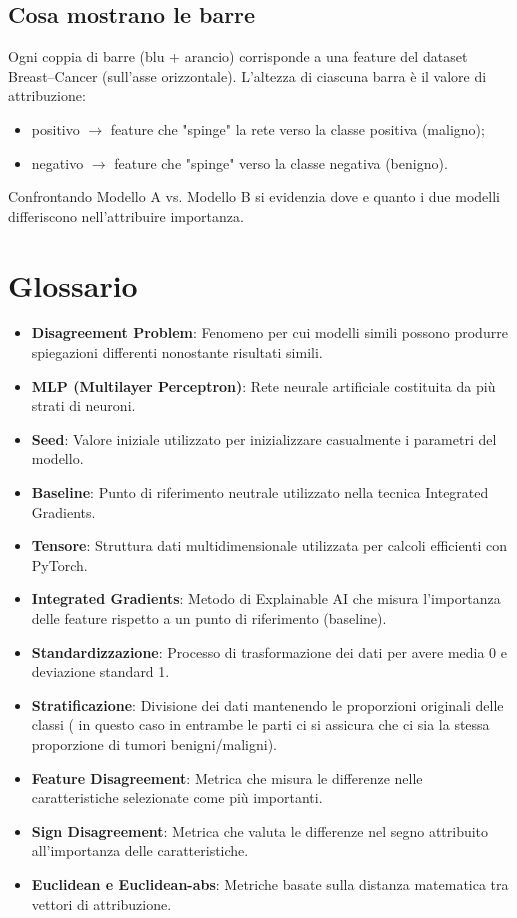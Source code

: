 \documentclass[a4paper,11pt]{article}
\begin{document}
\subsection*{Cosa mostrano le barre}
Ogni coppia di barre (blu + arancio) corrisponde a una feature del dataset Breast–Cancer (sull’asse orizzontale). 
L’altezza di ciascuna barra è il valore di attribuzione:
\begin{itemize}
  \item positivo $\to$ feature che "spinge" la rete verso la classe positiva (maligno);
  \item negativo $\to$ feature che "spinge" verso la classe negativa (benigno).
\end{itemize}
Confrontando Modello A vs. Modello B si evidenzia dove e quanto i due modelli differiscono nell'attribuire importanza.

\section{Glossario}
\begin{itemize}
\item \textbf{Disagreement Problem}: Fenomeno per cui modelli simili possono produrre spiegazioni differenti nonostante risultati simili.
\item \textbf{MLP (Multilayer Perceptron)}: Rete neurale artificiale costituita da più strati di neuroni.
\item \textbf{Seed}: Valore iniziale utilizzato per inizializzare casualmente i parametri del modello.
\item \textbf{Baseline}: Punto di riferimento neutrale utilizzato nella tecnica Integrated Gradients.
\item \textbf{Tensore}: Struttura dati multidimensionale utilizzata per calcoli efficienti con PyTorch.
\item \textbf{Integrated Gradients}: Metodo di Explainable AI che misura l'importanza delle feature rispetto a un punto di riferimento (baseline).
\item \textbf{Standardizzazione}: Processo di trasformazione dei dati per avere media 0 e deviazione standard 1.
\item \textbf{Stratificazione}: Divisione dei dati mantenendo le proporzioni originali delle classi ( in questo caso in entrambe le parti ci si assicura che ci sia la stessa proporzione di tumori benigni/maligni).
\item \textbf{Feature Disagreement}: Metrica che misura le differenze nelle caratteristiche selezionate come più importanti.
\item \textbf{Sign Disagreement}: Metrica che valuta le differenze nel segno attribuito all'importanza delle caratteristiche.
\item \textbf{Euclidean e Euclidean-abs}: Metriche basate sulla distanza matematica tra vettori di attribuzione.
\end{itemize}
\end{document}
